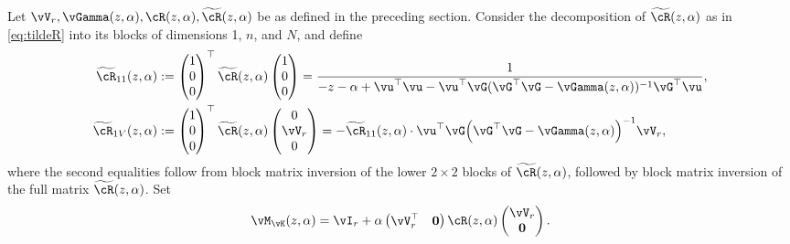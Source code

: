 Let $\vV_r,\vGamma(z,\alpha),\vcR(z,\alpha),\widetilde
\vcR(z,\alpha)$ be as defined in the preceding section.
Consider the decomposition of
$\widetilde \vcR(z,\alpha)$ as in \eqref{eq:tildeR}
into its blocks of dimensions 1, $n$, and $N$, and define
\begin{align}
\widetilde \cR_{11}(z,\alpha)&:=\begin{pmatrix} 1 \\ 0 \\ 0 \end{pmatrix}^\top
\widetilde \vcR(z,\alpha) \begin{pmatrix} 1 \\ 0 \\ 0 \end{pmatrix}
=\frac{1}{-z-\alpha+\vu^\top \vu-\vu^\top
\vG(\vG^\top\vG-\vGamma(z,\alpha))^{-1} \vG^\top\vu},
\label{eq:R11}\\
\widetilde \vcR_{1V}(z,\alpha)&:=\begin{pmatrix} 1 \\ 0 \\ 0 \end{pmatrix}^\top
\widetilde \vcR(z,\alpha) \begin{pmatrix} 0 \\ \vV_r \\ 0 \end{pmatrix}
={-}\widetilde \cR_{11}(z,\alpha) \cdot
\vu^\top \vG\Big(\vG^\top \vG-\vGamma(z,\alpha)\Big)^{-1}\vV_r,
\label{eq:R1V}
\end{align}
where the second equalities follow from block matrix inversion of
the lower $2 \times 2$ blocks of $\widetilde \vcR(z,\alpha)$,
followed by block matrix inversion of the full matrix $\widetilde
\vcR(z,\alpha)$. Set
	\begin{equation}\label{eq:eigen-vector-iden}
	\vM_{\vK}(z,\alpha) = 
\vI_r+\alpha \begin{pmatrix} \vV_r^\top & \mathbf{0} \end{pmatrix}
\vcR(z,\alpha)\begin{pmatrix} \vV_r \\ \mathbf{0} \end{pmatrix}.
	\end{equation} 

